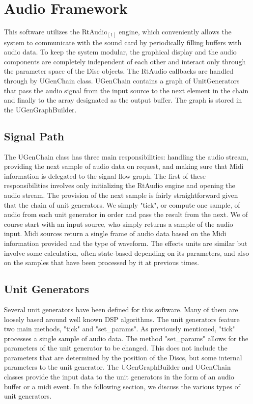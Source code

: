\documentclass[pdftext,twoside,10pt]{article}
\begin{document}
\section{Audio Framework}

This software utilizes the RtAudio$_{[1]}$ engine, which conveniently allows the system to communicate with the sound card by periodically filling buffers with audio data. To keep the system modular, the graphical display and the audio components are completely independent of each other and interact only through the parameter space of the Disc objects. The RtAudio callbacks are handled through by UGenChain class. UGenChain contains a graph of UnitGenerators that pass the audio signal from the input source to the next element in the chain and finally to the array designated as the output buffer. The graph is stored in the UGenGraphBuilder.

\subsection{Signal Path}
The UGenChain class has three main responsibilities: handling the audio stream, providing the next sample of audio data on request, and making sure that Midi information is delegated to the signal flow graph. The first of these responsibilities involves only initializing the RtAudio engine and opening the audio stream. The provision of the next sample is fairly straightforward given that the chain of unit generators. We simply "tick", or compute one sample, of audio from each unit generator in order and pass the result from the next. We of course start with an input source, who simply returns a sample of the audio input. Midi sources return a single frame of audio data based on the Midi information provided and the type of waveform. The effects units are similar but involve some calculation, often state-based depending on its parameters, and also on the samples that have been processed by it at previous times.

\subsection{Unit Generators}
Several unit generators have been defined for this software. Many of them are loosely based around well known DSP algorithms. The unit generators feature two main methods, "tick" and "set\_params". As previously mentioned, "tick" processes a single sample of audio data. The method "set\_params" allows for the parameters of the unit generator to be changed. This does not include the parameters that are determined by the position of the Discs, but some internal parameters to the unit generator. The UGenGraphBuilder and UGenChain classes provide the input data to the unit generators in the form of an audio buffer or a midi event. In the following section, we discuss the various types of unit generators.
\end{document}
